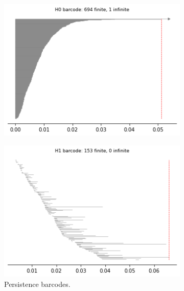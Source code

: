 \begin{figure}[H]
\begin{subfigure}[b]{0.25\textwidth}
\end{subfigure}
\begin{subfigure}[b]{0.24\textwidth}
    \includegraphics[width=\textwidth]{figures/topology/X6_H0_barcode.png}
    \caption{}
\end{subfigure}
\begin{subfigure}[b]{0.24\textwidth}
    \includegraphics[width=\textwidth]{figures/topology/X6_H1_barcode.png}
        \caption{Persistence barcodes.}
\end{subfigure}
\begin{subfigure}[b]{0.24\textwidth}

\end{subfigure}
\end{figure}
